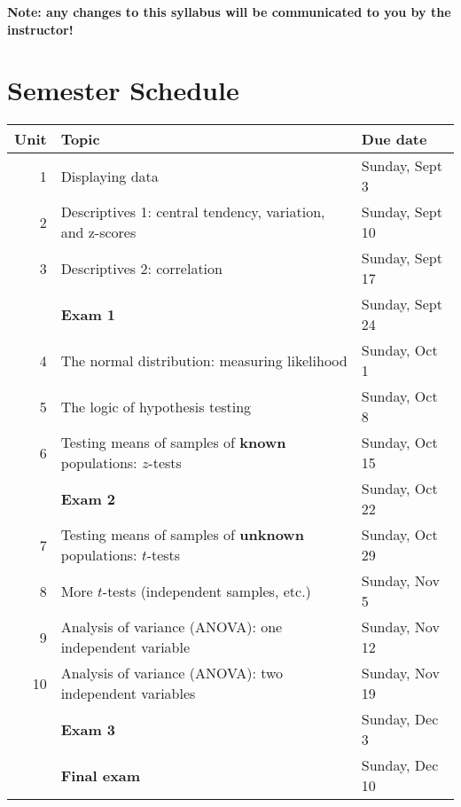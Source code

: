 \documentclass[10pt]{article}
\begin{document}
\textbf{Note:  any changes to this syllabus will be communicated to you by the instructor!}

\section*{Semester Schedule}
\label{sec-11}
\begin{center}
\begin{tabular}{rll}
Unit & Topic & Due date\\
\hline
1 & Displaying data & Sunday, Sept 3\\
2 & Descriptives 1: central tendency, variation, and z-scores & Sunday, Sept 10\\
3 & Descriptives 2: correlation & Sunday, Sept 17\\
 & \textbf{Exam 1} & Sunday, Sept 24\\
4 & The normal distribution: measuring likelihood & Sunday, Oct 1\\
5 & The logic of hypothesis testing & Sunday, Oct 8\\
6 & Testing means of samples of \textbf{known} populations: $z$-tests & Sunday, Oct 15\\
 & \textbf{Exam 2} & Sunday, Oct 22\\
7 & Testing means of samples of \textbf{unknown} populations: $t$-tests & Sunday, Oct 29\\
8 & More $t$-tests (independent samples, etc.) & Sunday, Nov 5\\
9 & Analysis of variance (ANOVA): one independent variable & Sunday, Nov 12\\
10 & Analysis of variance (ANOVA): two independent variables & Sunday, Nov 19\\
 & \textbf{Exam 3} & Sunday, Dec 3\\
 & \textbf{Final exam} & Sunday, Dec 10\\
\end{tabular}
\end{center}
\end{document}
